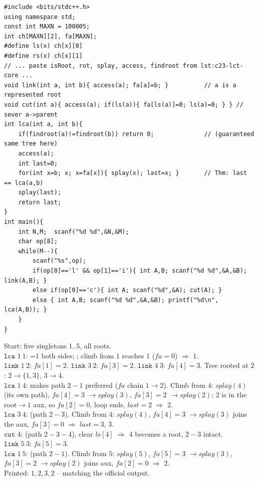 \begin{lstlisting}[caption={SPOJ DYNALCA: the rooted LCT of lst:c23-lct-core plus link/cut/lca. Reuses isRoot/rot/splay/access/findroot verbatim. ASCII only}, label={lst:c23-dynalca}]
#include <bits/stdc++.h>
using namespace std;
const int MAXN = 100005;
int ch[MAXN][2], fa[MAXN];
#define ls(x) ch[x][0]
#define rs(x) ch[x][1]
// ... paste isRoot, rot, splay, access, findroot from lst:c23-lct-core ...
void link(int a, int b){ access(a); fa[a]=b; }          // a is a represented root
void cut(int a){ access(a); if(ls(a)){ fa[ls(a)]=0; ls(a)=0; } } // sever a->parent
int lca(int a, int b){
    if(findroot(a)!=findroot(b)) return 0;              // (guaranteed same tree here)
    access(a);
    int last=0;
    for(int x=b; x; x=fa[x]){ splay(x); last=x; }       // Thm: last == lca(a,b)
    splay(last);
    return last;
}
int main(){
    int N,M;  scanf("%d %d",&N,&M);
    char op[8];
    while(M--){
        scanf("%s",op);
        if(op[0]=='l' && op[1]=='i'){ int A,B; scanf("%d %d",&A,&B); link(A,B); }
        else if(op[0]=='c'){ int A; scanf("%d",&A); cut(A); }
        else { int A,B; scanf("%d %d",&A,&B); printf("%d\n", lca(A,B)); }
    }
}
\end{lstlisting}

\begin{tracebox}
Start: five singletons \(1..5\), all roots.\\
\(\texttt{lca }1\ 1\): =\(1\) both sides; ; climb
from \(1\) reaches \(1\) (\(\mathit{fa}=0\)) \(\Rightarrow\) \(\boxed{1}\).\\
\(\texttt{link }1\ 2\): \(\mathit{fa}[1]{=}2\). \(\texttt{link }3\ 2\):
\(\mathit{fa}[3]{=}2\). \(\texttt{link }4\ 3\): \(\mathit{fa}[4]{=}3\). Tree rooted at
\(2\): \(2\!\to\!\{1,3\}\), \(3\!\to\!4\).\\
\(\texttt{lca }1\ 4\):  makes path \(2\!-\!1\) preferred
(\(\mathit{fa}\) chain \(1\!\to\!2\)). Climb from \(4\): \(splay(4)\) (its own path),
\(\mathit{fa}[4]{=}3\) \(\to splay(3)\), \(\mathit{fa}[3]{=}2\) \(\to splay(2)\): \(2\)
is in the root\(\to1\) aux, so \(\mathit{fa}[2]{=}0\), loop ends,
\(\mathit{last}=2\) \(\Rightarrow\) \(\boxed{2}\).\\
\(\texttt{lca }3\ 4\):  (path \(2\!-\!3\)). Climb from \(4\):
\(splay(4)\), \(\mathit{fa}[4]{=}3\) \(\to splay(3)\) joins the aux,
\(\mathit{fa}[3]{=}0\) \(\Rightarrow\) \(\mathit{last}=3\), \(\boxed{3}\).\\
\(\texttt{cut }4\):  (path \(2\!-\!3\!-\!4\)), clear
\(\mathit{ls}[4]\) \(\Rightarrow\) \(4\) becomes a root, \(2\!-\!3\) intact.\\
\(\texttt{link }5\ 3\): \(\mathit{fa}[5]{=}3\).\\
\(\texttt{lca }1\ 5\):  (path \(2\!-\!1\)). Climb from \(5\):
\(splay(5)\), \(\mathit{fa}[5]{=}3\) \(\to splay(3)\), \(\mathit{fa}[3]{=}2\) \(\to
splay(2)\) joins aux, \(\mathit{fa}[2]{=}0\) \(\Rightarrow\) \(\boxed{2}\).\\
Printed: \(1,2,3,2\) -- matching the official output.
\end{tracebox}

